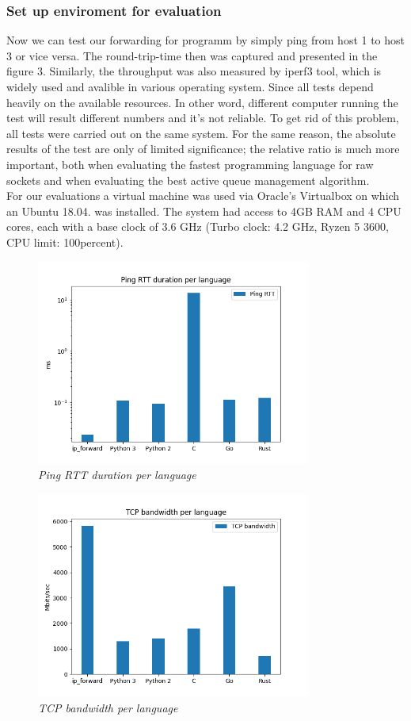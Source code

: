 \subsubsection{Set up enviroment for evaluation}
Now we can test our forwarding for programm by simply ping from host 1 to host 3 or vice versa. The round-trip-time then was captured and presented in the figure 3. Similarly, the throughput was also measured by iperf3 tool, which is widely used and avalible in various operating system. Since all tests depend heavily on the available resources. In other word, different computer running the test will result different numbers and it's not reliable. To get rid of this problem, all tests were carried out on the same system. For the same reason, the absolute results of the test are only of limited significance; the relative ratio is much more important, both when evaluating the fastest programming language for raw sockets and when evaluating the best active queue management algorithm.\\
For our evaluations a virtual machine was used via Oracle's Virtualbox on which an Ubuntu 18.04. was installed. The system had access to 4GB RAM and 4 CPU cores, each with a base clock of 3.6 GHz (Turbo clock: 4.2 GHz, Ryzen 5 3600, CPU limit: 100percent).\\
\begin{figure}[h]
\centering
\includegraphics*[width=9cm]{ping}
\caption{\em Ping RTT duration per language}
\label{fig:ping}
\end{figure}


\begin{figure}[h]
\centering
\includegraphics*[width=9cm]{tcp}
\caption{\em TCP bandwidth per language}
\label{fig:tcp}
\end{figure}


